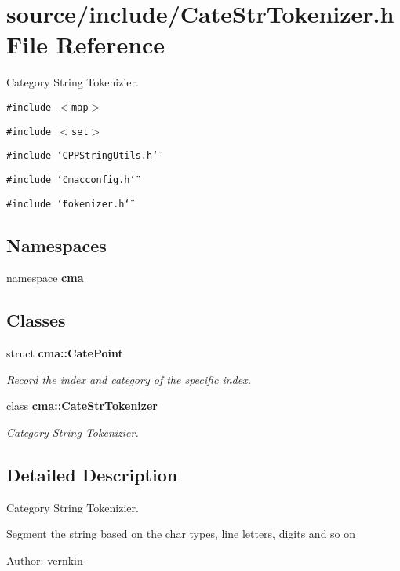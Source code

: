 \section{source/include/CateStrTokenizer.h File Reference}
\label{CateStrTokenizer_8h}
Category String Tokenizier. 

{\tt \#include $<$map$>$}\par
{\tt \#include $<$set$>$}\par
{\tt \#include \char`\"{}CPPStringUtils.h\char`\"{}}\par
{\tt \#include \char`\"{}cmacconfig.h\char`\"{}}\par
{\tt \#include \char`\"{}tokenizer.h\char`\"{}}\par
\subsection*{Namespaces}
\begin{CompactItemize}
\item 
namespace \textbf{cma}
\end{CompactItemize}
\subsection*{Classes}
\begin{CompactItemize}
\item 
struct {\bf cma::CatePoint}
\begin{CompactList}\small\item\em Record the index and category of the specific index. \item\end{CompactList}\item 
class {\bf cma::CateStrTokenizer}
\begin{CompactList}\small\item\em Category String Tokenizier. \item\end{CompactList}\end{CompactItemize}


\subsection{Detailed Description}
Category String Tokenizier. 

Segment the string based on the char types, line letters, digits and so on

\begin{Desc}
\item[Author:]vernkin \end{Desc}
